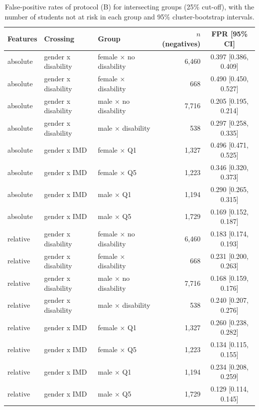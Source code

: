 \begin{table}[!ht]
\centering
\caption{False-positive rates of protocol (B) for intersecting groups (25\% cut-off), with the number of students not at risk in each group and 95\% cluster-bootstrap intervals.}
\label{tab:s-intersection}
\footnotesize
\begin{tabular}{@{}lllrc@{}}
\toprule
Features & Crossing & Group & $n$ (negatives) & FPR [95\% CI] \\
\midrule
absolute & gender x disability & female × no disability & 6,460 & 0.397 [0.386, 0.409] \\
absolute & gender x disability & female × disability & 668 & 0.490 [0.450, 0.527] \\
absolute & gender x disability & male × no disability & 7,716 & 0.205 [0.195, 0.214] \\
absolute & gender x disability & male × disability & 538 & 0.297 [0.258, 0.335] \\
absolute & gender x IMD & female × Q1 & 1,327 & 0.496 [0.471, 0.525] \\
absolute & gender x IMD & female × Q5 & 1,223 & 0.346 [0.320, 0.373] \\
absolute & gender x IMD & male × Q1 & 1,194 & 0.290 [0.265, 0.315] \\
absolute & gender x IMD & male × Q5 & 1,729 & 0.169 [0.152, 0.187] \\
relative & gender x disability & female × no disability & 6,460 & 0.183 [0.174, 0.193] \\
relative & gender x disability & female × disability & 668 & 0.231 [0.200, 0.263] \\
relative & gender x disability & male × no disability & 7,716 & 0.168 [0.159, 0.176] \\
relative & gender x disability & male × disability & 538 & 0.240 [0.207, 0.276] \\
relative & gender x IMD & female × Q1 & 1,327 & 0.260 [0.238, 0.282] \\
relative & gender x IMD & female × Q5 & 1,223 & 0.134 [0.115, 0.155] \\
relative & gender x IMD & male × Q1 & 1,194 & 0.234 [0.208, 0.259] \\
relative & gender x IMD & male × Q5 & 1,729 & 0.129 [0.114, 0.145] \\
\bottomrule
\end{tabular}
\end{table}
